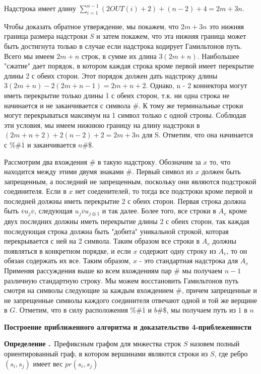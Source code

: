 \documentclass[11pt,a4paper]{article}
\newcommand\ifnonempty[2]{\ifthenelse{\equal{#1}{}}{}{#2}}
\newcounter{defin}
\newcommand{\defin}[1][]{\smallskip\par\hangafter=1\normalsize\textbf{Определение \refstepcounter{defin}\thedefin\ifnonempty{#1}{ (#1)}.}~}
\begin{document}
Надстрока имеет длину $\sum\limits_{i = 1}^{n - 1} (2OUT(i) + 2) + (n - 2) + 4 = 2m + 3n$.
\par
Чтобы доказать обратное утверждение, мы покажем, что $2m + 3n$ это нижняя граница размера надстроки $S$ и затем покажем, что эта нижняя граница может быть достигнута только в случае если надстрока
кодирует Гамильтонов путь. Всего мы имеем $2m + n$ строк, в сумме их длина $3(2m + n)$. Наибольшее "сжатие" дает порядок, в котором каждая строка кроме первой имеет перекрытие длины 2 с обеих сторон.
Этот порядок должен дать надстроку длины $3(2m + n) - 2(2m + n - 1) = 2m + n + 2$. Однако, n - 2 коннектора могут иметь перекрытие только длины 1 с обеих сторон,
т.к. ни одна строка не начинается и не заканчивается с символа $\#$.
К тому же терминальные строки могут перекрываться максимум на 1 символ только с одной строны. Соблюдая эти условия, мы имеем нижнюю границу на длину надстроки в
$(2m + n + 2) + 2(n - 2) + 2 = 2m + 3n$ для S. Отметим, что она начинается с $\%\#\overline{1}$ и заканчивается $n\#\$$.
\par Рассмотрим два вхождения $\#$ в такую надстроку. Обозначим за $x$ то, что находится между этими двумя знаками $\#$. Первый символ из $x$ должен быть запрещенным, а
последний не запрещенным, поскольку они являются подстрокой соединителя. Если в $x$ нет соеденителей, то тогда все подстроки кроме первой и последней должны иметь перекрытие 2 с обеих сторон.
Первая строка должна быть $\overline{v}u_j\overline{v}$, следующая $u_j\overline{v}u_{j \oplus 1}$ и так далее. Более того, все строки в $A_v$ кроме двух последних должны иметь перекрытие длины 2
с обеих сторон, так каждая последующая строка должна быть "добита" уникальной строкой, которая перекрывается с ней на 2 символа. Таким образом все строки в $A_v$ должны появляться в
конкретном порядке, и если $x$ содержит одну строку из $A_v$, то он обязан содержать их все. Таким образом, $x$ - это стандартная надстрока для $A_v$
Применяя рассуждения выше ко всем вхождениям пар $\#$ мы получаем $n - 1$ различную стандартную строку. Мы можем восстановить Гамильтонов путь смотря на символы следующие за каждым вхождением $\#$,
причем запрещенные и не запрещенные символы каждого соединителя отвечают одной и той же верщине в $G$. Отметим, что в силу расположения $\%\#\overline{1}$ и $b\#\$$, мы получаем путь из $1$ в $n$
\begin{center}
  \Large
  \textbf{Построение приближенного алгоритма и доказательство 4-приблеженности}
  \normalsize
\end{center}
\defin Префиксным графом для мнжества строк $S$ назовем полный ориентированный граф, в котором вершинами являются строки из $S$, где ребро $(s_i, s_j)$ имеет вес $pr(s_i, s_j)$
\end{document}
